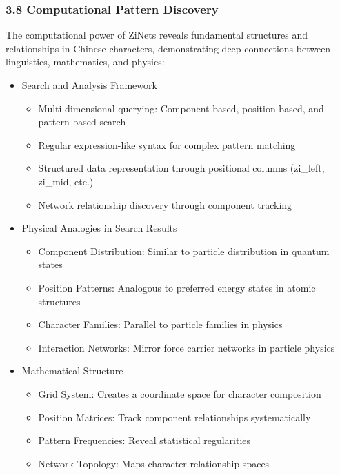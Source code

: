 \documentclass[
  11pt,
  letterpaper,
]{article}
\providecommand{\tightlist}{%
  \setlength{\itemsep}{0pt}\setlength{\parskip}{0pt}}
\begin{document}
\hypertarget{computational-pattern-discovery}{%
\subsubsection{3.8 Computational Pattern
Discovery}\label{computational-pattern-discovery}}

The computational power of ZiNets reveals fundamental structures and
relationships in Chinese characters, demonstrating deep connections
between linguistics, mathematics, and physics:

\begin{itemize}
\tightlist
\item
  Search and Analysis Framework

  \begin{itemize}
  \tightlist
  \item
    Multi-dimensional querying: Component-based, position-based, and
    pattern-based search
  \item
    Regular expression-like syntax for complex pattern matching
  \item
    Structured data representation through positional columns (zi\_left,
    zi\_mid, etc.)
  \item
    Network relationship discovery through component tracking
  \end{itemize}
\item
  Physical Analogies in Search Results

  \begin{itemize}
  \tightlist
  \item
    Component Distribution: Similar to particle distribution in quantum
    states
  \item
    Position Patterns: Analogous to preferred energy states in atomic
    structures
  \item
    Character Families: Parallel to particle families in physics
  \item
    Interaction Networks: Mirror force carrier networks in particle
    physics
  \end{itemize}
\item
  Mathematical Structure

  \begin{itemize}
  \tightlist
  \item
    Grid System: Creates a coordinate space for character composition
  \item
    Position Matrices: Track component relationships systematically
  \item
    Pattern Frequencies: Reveal statistical regularities
  \item
    Network Topology: Maps character relationship spaces
  \end{itemize}
\end{itemize}
\end{document}

